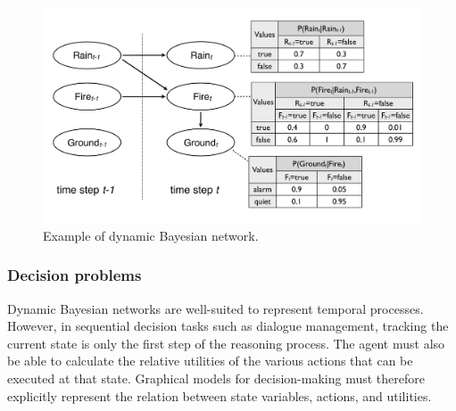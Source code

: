 \begin{figure}[h]
\centering
\includegraphics[scale=0.25]{imgs/dbn.pdf}
\caption{Example of dynamic Bayesian network. }
\label{fig:dbn}
\end{figure}



\subsubsection*{Decision problems}

Dynamic Bayesian networks are well-suited to represent temporal processes.  However, in sequential decision tasks such as dialogue management, tracking the current state is only the first step of the reasoning process. The agent must also be able to calculate the relative utilities of the various actions that can be executed at that  state. Graphical models for decision-making must therefore explicitly represent the relation between state variables, actions, and utilities. 

